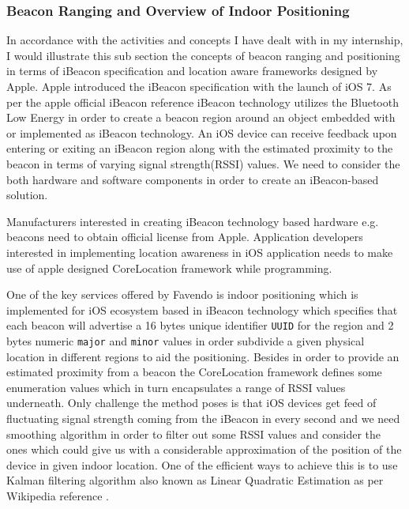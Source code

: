 \subsubsection{Beacon Ranging and Overview of Indoor Positioning}
In accordance with the activities and concepts I have dealt with in my internship, I would illustrate this sub section the concepts of beacon ranging and positioning in terms of iBeacon specification and location aware frameworks designed by Apple. Apple introduced the iBeacon specification  with the launch of iOS 7. As per the apple official iBeacon reference \cite{appleibeacon} iBeacon technology utilizes the Bluetooth Low Energy in order to create a beacon region around an object embedded with or implemented as iBeacon technology. An iOS device can receive feedback upon entering or exiting an iBeacon region along with the estimated proximity to the beacon in terms of varying signal strength(RSSI)  values. We need to consider the both hardware and software components in order to create an iBeacon-based solution.
\par Manufacturers interested in creating iBeacon technology based hardware e.g. beacons need to obtain official license from Apple. Application developers interested in implementing location awareness in iOS application needs to make use of apple designed CoreLocation \cite{applecorelocation} framework while programming.
\par One of the key services offered by Favendo is indoor positioning which is implemented for iOS ecosystem based in iBeacon technology which specifies that each beacon will advertise a 16 bytes unique identifier \texttt{UUID} for the region and 2 bytes numeric \texttt{major} and \texttt{minor}  values in order subdivide a given physical location in different regions to aid the positioning. Besides in order to provide an estimated proximity from a beacon the CoreLocation framework defines some enumeration values which in turn encapsulates a range of RSSI values underneath. Only challenge the method poses is that iOS devices get feed of fluctuating signal strength coming from the iBeacon in every second and we need smoothing algorithm in order to filter out some RSSI values and consider the ones which could give us with a considerable approximation of the position of the device in given indoor location. One of the efficient ways to achieve this is to use Kalman filtering algorithm also known as Linear Quadratic Estimation as per Wikipedia reference \cite{wikikalmanfilter}. 
